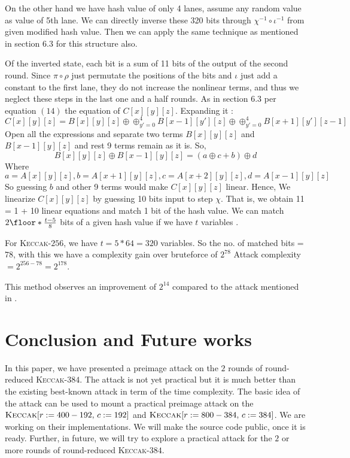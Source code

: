 \documentclass[runningheads]{llncs}
\newcommand{\KECCAK}{\mbox{\textsc{Keccak}}}
\newcommand{\Keccak}{\mbox{\textsc{Keccak}}}
\begin{document}
On the other hand we have hash value of only 4 lanes, assume any random value as value of 5th lane.
We can directly inverse these 320 bits through $\chi^{-1} \circ \iota^{-1}$ from given modified hash value.
Then we can apply the same technique as mentioned in section 6.3 \cite{guo2016linear} for this structure also. 

Of the inverted state, each bit is a sum of 11 bits of the output of the second round. Since $\pi \circ \rho$ just permutate the positions of the bits and $\iota$ just add a constant to the first lane, they do not increase the nonlinear terms, and thus we neglect these steps in the last one and a half rounds. As in section 6.3 per equation $(14)$ the equation of $C[x][y][z]$. Expanding it :
    \[
        C[x][y][z] = B[x][y][z] \oplus \oplus_{y' = 0}^{4} B[x-1][y'][z] \oplus \oplus_{y' = 0}^{4} B[x+1][y'][z-1]
    \]
    Open all the expressions and separate two terms $B[x][y][z]$ and $B[x-1][y][z]$ and rest 9 terms remain as it is.
    So, \[ B[x][y][z] \oplus B[x-1][y][z] = (a \oplus c + b) \oplus d
    \]
    Where \[
        a = A[x][y][z], b = A[x + 1][y][z], c = A[x + 2][y][z], d = A[x - 1][y][z]
    \]
    So guessing $b$ and other 9 terms would make $C[x][y][z]$ linear. Hence, We linearize $C[x][y][z]$ by guessing 10 bits input to step $\chi$. That is, we obtain 11 = 1 + 10 linear equations and match 1 bit of the hash value.
We can match $2\floor*{\frac{t - 5}{8}}$ bits of a given hash value if we have $t$ variables \cite{guo2016linear}.

For \Keccak-$256$, we have $t = 5*64 = 320$ variables.
So the no. of matched bits = $78$, with this we have a complexity gain over bruteforce of $2^{78}$
Attack complexity $ = 2^{256 - 78} = 2^{178}$.

This method observes an improvement of $2^{14}$ compared to the attack mentioned in \cite{guo2016linear}.

\section{Conclusion and Future works}
In this paper, we have presented a preimage attack on the $2$ rounds of round-reduced \KECCAK-$384$. The attack is not yet practical but it is much better than the existing best-known attack in term of the time complexity. The basic idea of the attack can be used to mount a practical preimage attack on the $\Keccak[r:=400-192,\, c:=192]$ and $\Keccak[r:=800-384,\,c:=384]$. 
We are working on their implementations. We will make the source code public, once it is ready. 
Further, in future, we will try to explore a practical attack for the $2$ or more rounds of round-reduced \KECCAK-$384$.
\end{document}
